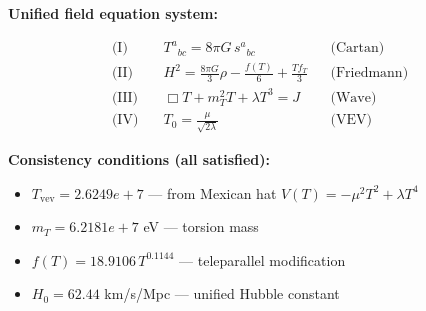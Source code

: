 
\textbf{Unified field equation system:}

\begin{align}
  \text{(I)} \quad & T^a{}_{bc} = 8\pi G \, s^a{}_{bc} && \text{(Cartan)} \\
  \text{(II)} \quad & H^2 = \frac{8\pi G}{3}\rho - \frac{f(T)}{6} + \frac{Tf_T}{3} && \text{(Friedmann)} \\
  \text{(III)} \quad & \Box T + m_T^2 T + \lambda T^3 = J && \text{(Wave)} \\
  \text{(IV)} \quad & T_0 = \frac{\mu}{\sqrt{2\lambda}} && \text{(VEV)}
\end{align}

\textbf{Consistency conditions (all satisfied):}
\begin{itemize}
  \item $T_{\text{vev}} = 2.6249e+7$ — from Mexican hat $V(T) = -\mu^2 T^2 + \lambda T^4$
  \item $m_T = 6.2181e+7$ eV — torsion mass
  \item $f(T) = 18.9106 \, T^{0.1144}$ — teleparallel modification
  \item $H_0 = 62.44$ km/s/Mpc — unified Hubble constant
\end{itemize}